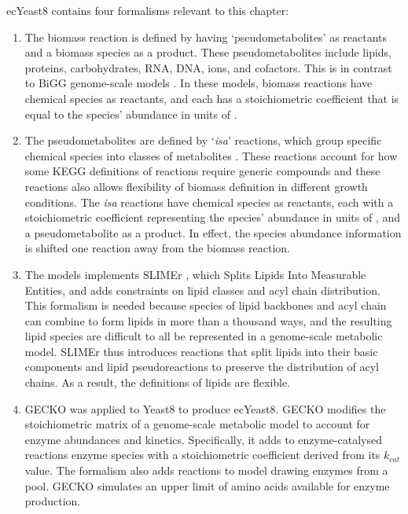 ecYeast8 contains four formalisms relevant to this chapter:
\begin{enumerate}
  \item
        The biomass reaction is defined by having `pseudometabolites' as reactants and a biomass species as a product.
        These pseudometabolites include lipids, proteins, carbohydrates, RNA, DNA, ions, and cofactors.
        This is in contrast to BiGG genome-scale models \parencite{norsigianBiGGModels20202020}.
        In these models, biomass reactions have chemical species as reactants, and each has a stoichiometric coefficient that is equal to the species' abundance in units of \SI{}{\mmolgdw}.
  \item
        The pseudometabolites are defined by `\textit{isa}' reactions, which group specific chemical species into classes of metabolites \parencite{heavnerYeastExpandedReconstruction2012}.
        These reactions account for how some KEGG definitions of reactions require generic compounds and these reactions also allows flexibility of biomass definition in different growth conditions.
        The \textit{isa} reactions have chemical species as reactants, each with a stoichiometric coefficient representing the species' abundance in units of \SI{}{\mmolgdw}, and a pseudometabolite as a product.
        In effect, the species abundance information is shifted one reaction away from the biomass reaction.
  \item
        The models implements SLIMEr \parencite{sanchezSLIMErProbingFlexibility2019}, which Splits Lipids Into Measurable Entities, and adds constraints on lipid classes and acyl chain distribution.
        This formalism is needed because species of lipid backbones and acyl chain can combine to form lipids in more than a thousand ways, and the resulting lipid species are difficult to all be represented in a genome-scale metabolic model.
        SLIMEr thus introduces reactions that split lipids into their basic components and lipid pseudoreactions to preserve the distribution of acyl chains.
        As a result, the definitions of lipids are flexible.
  \item
        GECKO was applied to Yeast8 to produce ecYeast8.
        GECKO modifies the stoichiometric matrix of a genome-scale metabolic model to account for enzyme abundances and kinetics.
        Specifically, it adds to enzyme-catalysed reactions enzyme species with a stoichiometric coefficient derived from its $k_{cat}$ value.
        The formalism also adds reactions to model drawing enzymes from a pool.
        GECKO simulates an upper limit of amino acids available for enzyme production.
\end{enumerate}


